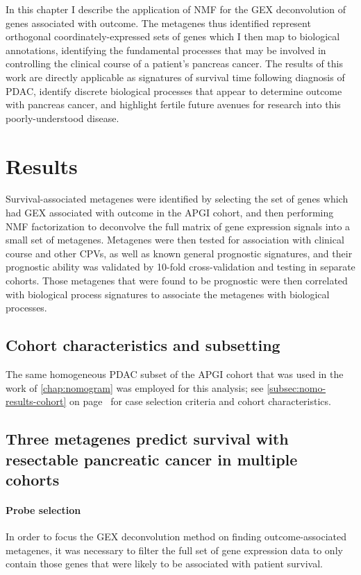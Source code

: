 \documentclass[dissertation.tex]{subfiles}
\begin{document}
In this chapter I describe the application of \gls{NMF} for the \gls{GEX} deconvolution of genes associated with outcome.  The metagenes thus identified represent orthogonal coordinately-expressed sets of genes which I then map to biological annotations, identifying the fundamental processes that may be involved in controlling the clinical course of a patient's pancreas cancer.  The results of this work are directly applicable as signatures of survival time following diagnosis of \gls{PDAC}, identify discrete biological processes that appear to determine outcome with pancreas cancer, and highlight fertile future avenues for research into this poorly-understood disease.


\section{Results}

Survival-associated metagenes were identified by selecting the set of genes which had \gls{GEX} associated with outcome in the \gls{APGI} cohort, and then performing \gls{NMF} factorization to deconvolve the full matrix of gene expression signals into a small set of metagenes.  Metagenes were then tested for association with clinical course and other \glspl{CPV}, as well as known general prognostic signatures, and their prognostic ability was validated by 10-fold cross-validation and testing in separate cohorts.  Those metagenes that were found to be prognostic were then correlated with biological process signatures to associate the metagenes with biological processes.

\subsection{Cohort characteristics and subsetting}
The same homogeneous \gls{PDAC} subset of the \gls{APGI} cohort that was used in the work of \cref{chap:nomogram} was employed for this analysis; see \cref{subsec:nomo-results-cohort} on page~\pageref{subsec:nomo-results-cohort} for case selection criteria and cohort characteristics.

\subsection{Three metagenes predict survival with resectable pancreatic cancer in multiple cohorts}
\paragraph{Probe selection}
In order to focus the \gls{GEX} deconvolution method on finding outcome-associated metagenes, it was necessary to filter the full set of gene expression data to only contain those genes that were likely to be associated with patient survival.
\end{document}
